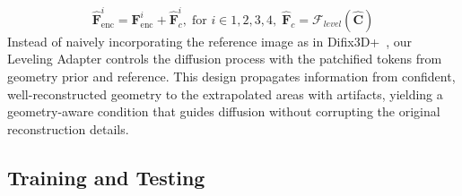 \begin{equation}
\hat{\mathbf{F}}_{\text{enc}}^i = \mathbf{F}_{\text{enc}}^i + \hat{\mathbf{F}}_c^i, \; \text{for } i \in {1,2,3,4}, \; \hat{\mathbf{F}}_c = \mathcal{F}_{level}(\hat{\mathbf{C}})
\end{equation} Instead of naively incorporating the reference image as in Difix3D+~\cite{wu2025difix3d+}, our Leveling Adapter controls the diffusion process with the patchified tokens from geometry prior and reference. This design propagates information from confident, well-reconstructed geometry to the extrapolated areas with artifacts, yielding a geometry-aware condition that guides diffusion without corrupting the original reconstruction details.
\subsection{Training and Testing}

